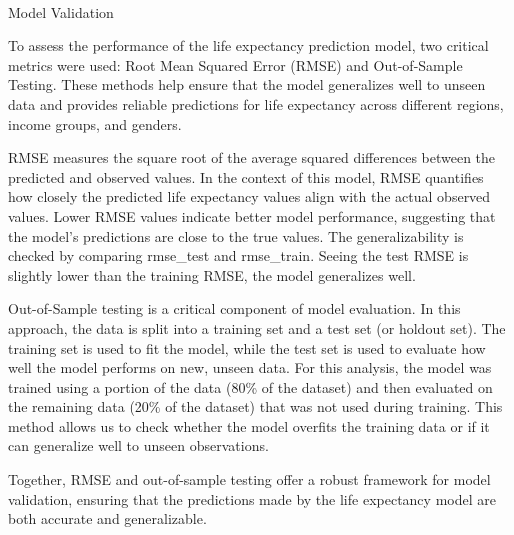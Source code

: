 \documentclass[
  letterpaper,
  DIV=11,
  numbers=noendperiod]{scrartcl}
\makeatletter
\let\oldparagraph\paragraph
\renewcommand{\paragraph}{
    \@ifstar
      \xxxParagraphStar
      \xxxParagraphNoStar
  }
\newcommand{\xxxParagraphStar}[1]{\oldparagraph*{#1}\mbox{}}
\newcommand{\xxxParagraphNoStar}[1]{\oldparagraph{#1}\mbox{}}
\newenvironment{Shaded}{\begin{snugshade}}{\end{snugshade}}
\newcommand{\CommentTok}[1]{\textcolor[rgb]{0.37,0.37,0.37}{#1}}
\makeatother
\begin{document}
\paragraph{Model Validation}\label{model-validation}

To assess the performance of the life expectancy prediction model, two
critical metrics were used: Root Mean Squared Error (RMSE) and
Out-of-Sample Testing. These methods help ensure that the model
generalizes well to unseen data and provides reliable predictions for
life expectancy across different regions, income groups, and genders.

RMSE measures the square root of the average squared differences between
the predicted and observed values. In the context of this model, RMSE
quantifies how closely the predicted life expectancy values align with
the actual observed values. Lower RMSE values indicate better model
performance, suggesting that the model's predictions are close to the
true values. The generalizability is checked by comparing rmse\_test and
rmse\_train. Seeing the test RMSE is slightly lower than the training
RMSE, the model generalizes well.

Out-of-Sample testing is a critical component of model evaluation. In
this approach, the data is split into a training set and a test set (or
holdout set). The training set is used to fit the model, while the test
set is used to evaluate how well the model performs on new, unseen data.
For this analysis, the model was trained using a portion of the data
(80\% of the dataset) and then evaluated on the remaining data (20\% of
the dataset) that was not used during training. This method allows us to
check whether the model overfits the training data or if it can
generalize well to unseen observations.

Together, RMSE and out-of-sample testing offer a robust framework for
model validation, ensuring that the predictions made by the life
expectancy model are both accurate and generalizable.

\begin{Shaded}
\end{Shaded}
\end{document}
